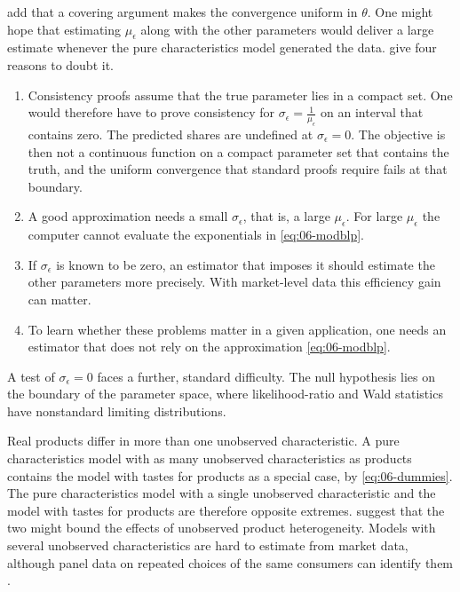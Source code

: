\citet[footnote~9]{BerryPakes2007} add that a covering argument makes the convergence uniform in $\theta$. One might
hope that estimating $\mu_\epsilon$ along with the other parameters would deliver a large estimate whenever the pure
characteristics model generated the data. \citet[p.~9]{BerryPakes2007} give four reasons to doubt it.
\begin{enumerate}
\item Consistency proofs assume that the true parameter lies in a compact set. One would therefore have to prove
consistency for $\sigma_\epsilon = \frac{1}{\mu_\epsilon}$ on an interval that contains zero. The predicted shares are
undefined at $\sigma_\epsilon = 0$. The objective is then not a continuous function on a compact parameter set that
contains the truth, and the uniform convergence that standard proofs require fails at that boundary.
\item A good approximation needs a small $\sigma_\epsilon$, that is, a large $\mu_\epsilon$. For large $\mu_\epsilon$ the
computer cannot evaluate the exponentials in \eqref{eq:06-modblp}.
\item If $\sigma_\epsilon$ is known to be zero, an estimator that imposes it should estimate the other parameters more
precisely. With market-level data this efficiency gain can matter.
\item To learn whether these problems matter in a given application, one needs an estimator that does not rely on the
approximation \eqref{eq:06-modblp}.
\end{enumerate}
A test of $\sigma_\epsilon = 0$ faces a further, standard difficulty. The null hypothesis lies on the boundary of the
parameter space, where likelihood-ratio and Wald statistics have nonstandard limiting distributions.

\begin{remark}\label{rem:06-bounding}
Real products differ in more than one unobserved characteristic. A pure characteristics model with as many unobserved
characteristics as products contains the model with tastes for products as a special case, by
\eqref{eq:06-dummies}. The pure characteristics model with a single unobserved characteristic and the model with
tastes for products are therefore opposite extremes. \citet[p.~12]{BerryPakes2007} suggest that the two might bound the
effects of unobserved product heterogeneity. Models with several unobserved characteristics are hard to estimate
from market data, although panel data on repeated choices of the same consumers can identify them
\citep{GoettlerShachar2001}.
\end{remark}

